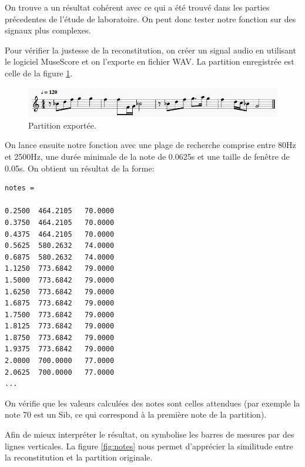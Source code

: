 \documentclass[french]{article}
\begin{document}
On trouve a un résultat cohérent avec ce qui a été trouvé dans les parties précedentes de l'étude de laboratoire. On peut donc tester notre fonction sur des signaux plus complexes.

Pour vérifier la justesse de la reconstitution, on créer un signal audio en utilisant le logiciel MuseScore et on l'exporte en fichier WAV. La partition enregistrée est celle de la figure \ref{fig:partition}.

\begin{figure}[h!]
	\centering
	\includegraphics[width=\textwidth]{images/partition.png}
	\caption{Partition exportée.}
	\label{fig:partition}
\end{figure}

On lance ensuite notre fonction avec une plage de recherche comprise entre 80Hz et 2500Hz, une durée minimale de la note de 0.0625s et une taille de fenêtre de 0.05s. On obtient un résultat de la forme:

\begin{lstlisting}
notes =

0.2500  464.2105   70.0000
0.3750  464.2105   70.0000
0.4375  464.2105   70.0000
0.5625  580.2632   74.0000
0.6875  580.2632   74.0000
1.1250  773.6842   79.0000
1.5000  773.6842   79.0000
1.6250  773.6842   79.0000
1.6875  773.6842   79.0000
1.7500  773.6842   79.0000
1.8125  773.6842   79.0000
1.8750  773.6842   79.0000
1.9375  773.6842   79.0000
2.0000  700.0000   77.0000
2.0625  700.0000   77.0000
...
\end{lstlisting}

On vérifie que les valeurs calculées des notes sont celles attendues (par exemple la note 70 est un Sib, ce qui correspond à la première note de la partition).

Afin de mieux interpréter le résultat, on symbolise les barres de mesures par des lignes verticales. La figure \ref{fig:notes} nous permet d'apprécier la similitude entre la reconstitution et la partition originale.
\end{document}
